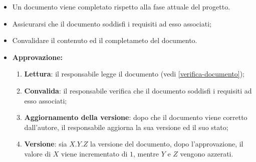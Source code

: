 \label{approvazione-documento}

\begin{itemize}
	\item Un documento viene completato rispetto alla fase attuale del progetto.
\end{itemize}

\begin{itemize}
	\item Assicurarsi che il documento soddisfi i requisiti ad esso associati;

	\item Convalidare il contenuto ed il completameto del documento.
\end{itemize}

\begin{itemize}
	\item \textbf{Approvazione:}
	      \begin{enumerate}
		      \item \textbf{Lettura}: il responsabile legge il
		            documento (vedi \cref{verifica-documento});

		      \item \textbf{Convalida}: il responsabile verifica che il
		            documento soddisfi i requisiti ad esso associati;

		      \item \textbf{Aggiornamento della versione}: dopo che il documento
		            viene corretto dall'autore, il responsabile aggiorna la
		            sua versione ed il suo stato;

		      \item \textbf{Versione}: sia $X.Y.Z$ la versione del documento,
		            dopo l'approvazione, il valore di $X$ viene incrementato di
		            $1$, mentre $Y$ e $Z$ vengono azzerati.
	      \end{enumerate}
\end{itemize}
